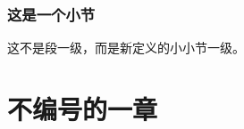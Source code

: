 \documentclass{ctexart}
\newcounter{subsubsubsection}
\begin{document}
        \subsubsection{这是一个小节}
                这不是段一级，而是新定义的小小节一级。

\section*{不编号的一章}
\end{document}
